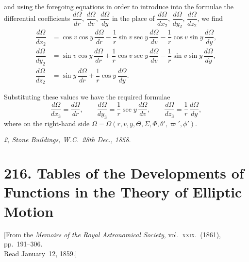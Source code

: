 \documentclass[12pt,a4paper]{article}
\theoremstyle{plain}
\begin{document}
\newpage
{} and using the foregoing equations in order to introduce into the formulae the differential coefficients $\dfrac{d\Omega}{dr}$, $\dfrac{d\Omega}{dv}$, $\dfrac{d\Omega}{dy}$ in the place of $\dfrac{d\Omega}{dx_{2}}$, $\dfrac{d\Omega}{dy_{2}}$, $\dfrac{d\Omega}{dz_{2}}$, we find
\begin{align*}
\dfrac{d\Omega}{dx_{2}} &= \cos v\cos y\,\dfrac{d\Omega}{dr}-\dfrac{1}{r}\sin v\sec y\,\dfrac{d\Omega}{dv}-\dfrac{1}{r}\cos v\sin y\,\dfrac{d\Omega}{dy},\\
\dfrac{d\Omega}{dy_{2}} &= \sin v\cos y\,\dfrac{d\Omega}{dr}+\dfrac{1}{r}\cos v\sec y\,\dfrac{d\Omega}{dv}-\dfrac{1}{r}\sin v\sin y\,\dfrac{d\Omega}{dy},\\
\dfrac{d\Omega}{dz_{2}} &= \sin y\,\dfrac{d\Omega}{dr}+\dfrac{1}{r}\cos y\,\dfrac{d\Omega}{dy}.
\end{align*}

\medskip
Substituting these values we have the required formulae
\[
\dfrac{d\Omega}{dx_{3}}=\dfrac{d\Omega}{dr},\qquad
\dfrac{d\Omega}{dy_{3}}=\dfrac{1}{r}\sec y\,\dfrac{d\Omega}{dv},\qquad
\dfrac{d\Omega}{dz_{3}}=\dfrac{1}{r}\,\dfrac{d\Omega}{dy},
\]
where on the right-hand side $\Omega=\Omega(r,v,y,\Theta,\varSigma,\varPhi,\theta',\varpi',\phi')$.

\medskip
\begin{flushright}
\textit{2, Stone Buildings, W.C.\ 28th Dec., 1858.}
\end{flushright}


\newpage
\section*{216. Tables of the Developments of Functions in the Theory of Elliptic Motion}


\begin{center}
[From the \textit{Memoirs of the Royal Astronomical Society}, vol.~\textsc{xxix}.\ (1861), pp.~191--306.\\
Read January~12, 1859.]
\end{center}
\end{document}
